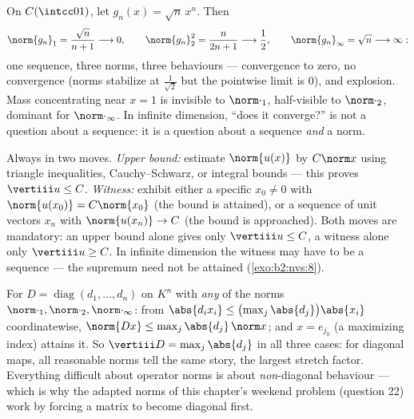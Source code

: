 \begin{example}\label{ex:b2:nvs:sqrtnxn}
On $C(\intcc01)$, let $g_n(x) = \sqrt{n}\,x^n$. Then
\[
\norm{g_n}_1 = \frac{\sqrt n}{n + 1} \longrightarrow 0,
\qquad
\norm{g_n}_2^2 = \frac{n}{2n + 1} \longrightarrow \frac12,
\qquad
\norm{g_n}_\infty = \sqrt n \longrightarrow \infty :
\]
one sequence, three norms, three behaviours --- convergence to
zero, no convergence (norms stabilize at $\frac1{\sqrt2}$ but
the pointwise limit is $0$), and explosion. Mass concentrating
near $x = 1$ is invisible to $\norm\cdot_1$, half-visible to
$\norm\cdot_2$, dominant for $\norm\cdot_\infty$. In infinite
dimension, ``does it converge?'' is not a question about a
sequence: it is a question about a sequence \emph{and} a norm.
\end{example}

\begin{method}\label{met:b2:nvs:opnorm}
Always in two moves. \emph{Upper bound:} estimate
$\norm{u(x)}$ by $C\norm x$ using triangle inequalities,
Cauchy--Schwarz, or integral bounds --- this proves $\vertiii u
\leq C$. \emph{Witness:} exhibit either a specific $x_0 \neq 0$
with $\norm{u(x_0)} = C\norm{x_0}$ (the bound is attained), or a
sequence of unit vectors $x_n$ with $\norm{u(x_n)} \to C$ (the
bound is approached). Both moves are mandatory: an upper bound
alone gives only $\vertiii u \leq C$, a witness alone only
$\vertiii u \geq C$. In infinite dimension the witness may have
to be a sequence --- the supremum need not be attained
(\cref{exo:b2:nvs:8}).
\end{method}

\begin{example}\label{ex:b2:nvs:diagonalnorm}
For $D = \operatorname{diag}(d_1, \dots, d_n)$ on $K^n$ with
\emph{any} of the norms $\norm\cdot_1, \norm\cdot_2,
\norm\cdot_\infty$: from $\abs{d_ix_i} \leq
\bigl(\max_j\abs{d_j}\bigr)\abs{x_i}$ coordinatewise,
$\norm{Dx} \leq \max_j\abs{d_j}\,\norm x$; and $x = e_{j_0}$
(a maximizing index) attains it. So $\vertiii D =
\max_j\abs{d_j}$ in all three cases: for diagonal maps, all
reasonable norms tell the same story, the largest stretch
factor. Everything difficult about operator norms is about
\emph{non}-diagonal behaviour --- which is why the adapted
norms of this chapter's weekend problem (question 22) work by
forcing a matrix to become diagonal first.
\end{example}

